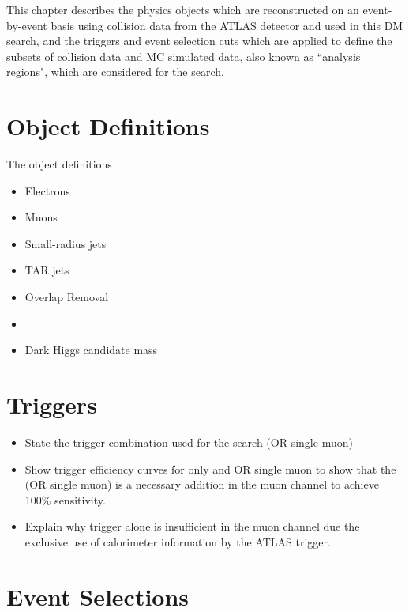 \label{chapter:objects}

This chapter describes the physics objects which are reconstructed on an event-by-event basis using collision data from the ATLAS detector and used in this DM search, and the triggers and event selection cuts which are applied to define the subsets of collision data and MC simulated data, also known as ``analysis regions", which are considered for the search. 

\section{Object Definitions}

The object definitions 

\begin{itemize}
\item Electrons
\item Muons
\item Small-radius \aktfour jets
\item TAR jets
\item Overlap Removal
\item \met
\item Dark Higgs candidate mass \ms
\end{itemize}

\section{Triggers}

\begin{itemize}
\item State the trigger combination used for the search (\met OR single muon)
\item Show trigger efficiency curves for \met only and \met OR single muon to show that the (OR single muon) is a necessary addition in the muon channel to achieve 100\% sensitivity.
\item Explain why \met trigger alone is insufficient in the muon channel due the exclusive use of calorimeter information by the ATLAS \met trigger.
\end{itemize}

\section{Event Selections}

